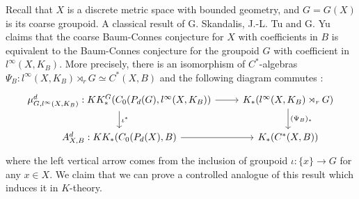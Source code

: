 
Recall that $X$ is a discrete metric space with bounded geometry, and $G=G(X)$ is its coarse groupoid. A classical result of G. Skandalis, J.-L. Tu and G. Yu \cite{SkTuYu} claims that the coarse Baum-Connes conjecture for $X$ with coefficients in $B$ is equivalent to the Baum-Connes conjecture for the groupoid $G$ with coefficient in $l^\infty(X,K_B)$. More precisely, there is an isomorphism of $C^*$-algebras $\Psi_B : l^\infty(X,K_B)\rtimes_r G \simeq C^*(X,B)$ and the following diagram commutes :
\[\begin{tikzcd}
\mu_{G,l^\infty(X,K_B)}^d : KK_*^G(C_0(P_d(G),l^\infty(X,K_B)) \arrow{r}\arrow{d}{\iota^*}& K_*(l^\infty(X, K_B)\rtimes_r G)\arrow{d}{(\Psi_B)_*}\\
A_{X,B}^d : KK_*(C_0(P_d(X),B) \arrow{r} & K_*(C^*(X,B))
\end{tikzcd}\]
where the left vertical arrow comes from the inclusion of groupoid $\iota :\{x\}\rightarrow G$ for any $x\in X$. We claim that we can prove a controlled analogue of this result which induces it in $K$-theory.

